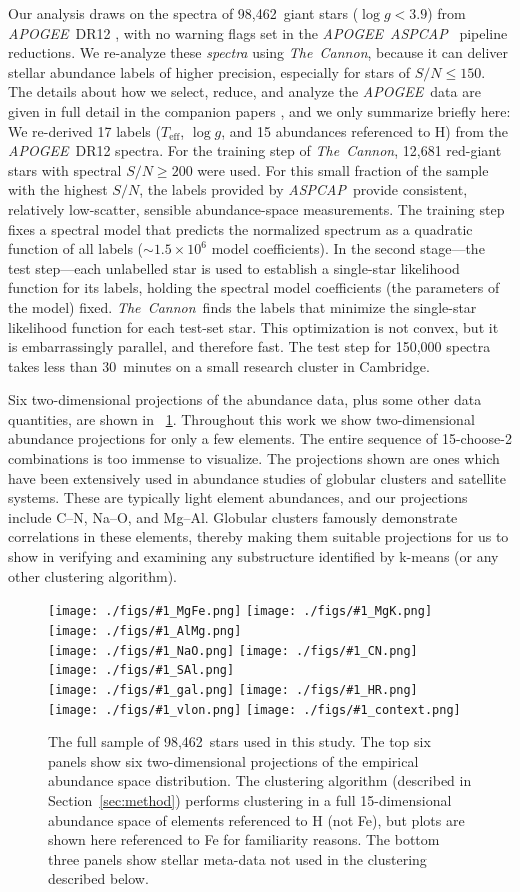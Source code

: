 \documentclass[12pt, letterpaper, preprint]{aastex}
\newcommand{\acronym}[1]{{\small{#1}}}
\newcommand{\project}[1]{\textsl{#1}}
\newcommand{\apogee}{\project{\acronym{APOGEE}}}
\newcommand{\aspcap}{\project{\acronym{ASPCAP}}}
\newcommand{\thecannon}{\project{The~Cannon}}
\newcommand{\sectionname}{Section}
\newcommand{\teff}{T_{\mathrm{eff}}}
\newcommand{\logg}{\log g}
\newcommand{\insanefigure}[1]{%
\texttt{[image: ./figs/\#1\_MgFe.png]}%
\texttt{[image: ./figs/\#1\_MgK.png]}%
\texttt{[image: ./figs/\#1\_AlMg.png]}\\
\texttt{[image: ./figs/\#1\_NaO.png]}%
\texttt{[image: ./figs/\#1\_CN.png]}%
\texttt{[image: ./figs/\#1\_SAl.png]}\\
\texttt{[image: ./figs/\#1\_gal.png]}%
\texttt{[image: ./figs/\#1\_HR.png]}\\
\texttt{[image: ./figs/\#1\_vlon.png]}%
\texttt{[image: ./figs/\#1\_context.png]}}
\newcommand{\totalnumber}{98,462}
\begin{document}
Our analysis draws on the spectra of \totalnumber\ giant stars ($\logg
< 3.9$) from \apogee\ \acronym{DR12} \citep{dr12}, with no warning flags
set in the \apogee\ \aspcap\ \citep{aspcap} pipeline
reductions.
We re-analyze these \emph{spectra} using \thecannon, because it can
deliver stellar abundance labels of higher precision, especially for
stars of $S/N \le 150$.
The details about how we select, reduce, and analyze the \apogee\ data
are given in full detail in the companion papers \citep{casey16,
  ness16}, and we only summarize briefly here:
We re-derived 17 labels ($\teff$, $\logg$, and 15 abundances
referenced to H) from the \apogee\ \acronym{DR12} spectra. 
For the training step of \thecannon, 
12,681 red-giant stars with spectral $S/N \ge 200$ were used.
For this small fraction of the sample with the highest $S/N$, the
labels provided by \aspcap\ provide consistent, relatively low-scatter, sensible
abundance-space measurements.
The training step fixes a spectral model
that predicts the normalized spectrum as a quadratic function of all
labels ($\sim 1.5\times10^6$ model coefficients). In the second stage---the test step---each unlabelled star is
used to establish a single-star likelihood function for its labels,
holding the spectral model coefficients (the parameters of the model) fixed.
\thecannon\ finds the labels that minimize the single-star likelihood
function for each test-set star.
This optimization is not convex, but it is embarrassingly parallel,
and therefore fast. The test
step for 150,000 spectra takes less than 30~minutes on a small 
research cluster in Cambridge.

Six two-dimensional projections of the abundance data, plus some other
data quantities, are shown in \figurename~\ref{fig:all}.  Throughout
this work we show two-dimensional abundance projections for only a few
elements. The entire sequence of 15-choose-2 combinations is too
immense to visualize. The projections shown are ones which
have been extensively used in abundance studies of globular clusters
and satellite systems. These are typically light element abundances,
and our projections include C--N, Na--O, and Mg--Al. Globular clusters
famously demonstrate correlations in these elements, thereby making
them suitable projections for us to show in verifying and examining
any substructure identified by k-means (or any other clustering algorithm).

\begin{figure}[!p]
\insanefigure{all}
\caption{The full sample of \totalnumber\ stars used in this study.
  The top six panels show six two-dimensional projections of the
  empirical abundance space distribution.
  The clustering algorithm (described in
  \sectionname~\ref{sec:method}) performs clustering in a full
  15-dimensional abundance space of elements referenced to H (not Fe),
  but plots are shown here referenced to Fe for familiarity reasons.
  The bottom three panels show stellar meta-data not used in the
  clustering described below.\label{fig:all}}
\end{figure}
\end{document}

